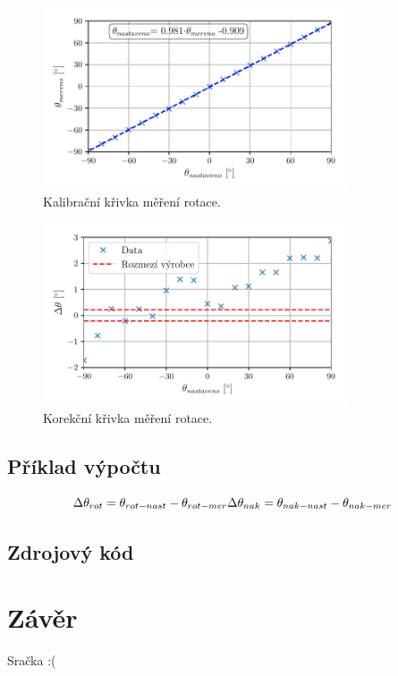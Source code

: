 \documentclass{protokol}
\begin{document}
    \begin{figure}[h!]
        \centering
        \includegraphics[width=0.8\textwidth]{img/rotace-kalib.pdf}
        \caption{Kalibrační křivka měření rotace.}
        \label{fig:img/graf-2}
    \end{figure}

    \begin{figure}[h!]
        \centering
        \includegraphics[width=0.8\textwidth]{img/rotace-korek.pdf}
        \caption{Korekční křivka měření rotace.}
        \label{fig:img/graf-2}
    \end{figure}

    \subsection{Příklad výpočtu}
    
    \[
        \Delta \theta_{rot} = \theta_{rot-nast} - \theta_{rot-mer} \\
        \Delta \theta_{nak} = \theta_{nak-nast} - \theta_{nak-mer} 
    \]

    \clearpage
    \subsection{Zdrojový kód}
    

        
        \clearpage
        \section*{Závěr}
            Sračka :(
\end{document}
